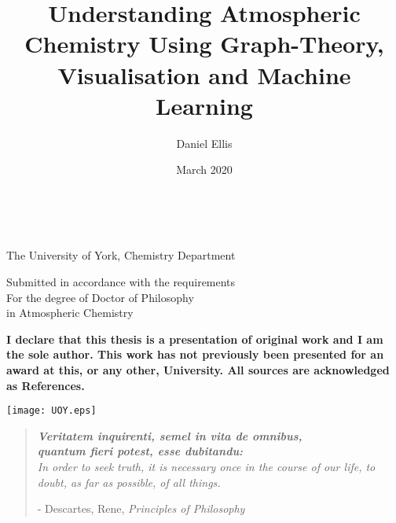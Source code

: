 \documentclass[twoside,openleft,reqno,a4paper,final]{book}
\title{Understanding Atmospheric Chemistry Using Graph-Theory, Visualisation and Machine Learning}
\author{Daniel Ellis}
\date{March 2020}
\makeatletter
\def\blankpage{%
      \clearpage%
      \thispagestyle{empty}%
      \addtocounter{page}{0}%
      \null%
      \clearpage}
\renewcommand{\maketitle}{

\thispagestyle{empty}
\begin{center}
\pagestyle{empty}
\phantom{.}  %
\vspace{1.5cm}

{\Huge \bf \@title\par}
\vspace{2cm}

{\LARGE \@author}\\[.7cm]

{\Large\@date}

\vspace{6cm}

The University of York, Chemistry Department

Submitted in accordance with the requirements\\
    For the degree of Doctor of Philosophy\\ in Atmospheric Chemistry

\vspace{1.3cm}


\textbf{I declare that this thesis is a presentation of original work and I am the sole author. This work has not previously been presented for an award at this, or any other, University. All sources are acknowledged as References.}

\vspace{1cm}
\texttt{[image: UOY.eps]}

\end{center}
}\makeatother
\makeatother
\begin{document}

\frontmatter
\titleformat{\paragraph}[hang]{\normalfont\normalsize\bfseries}{\theparagraph}{1em}{}



\setcounter{secnumdepth}{3}
\setcounter{tocdepth}{3}

 \maketitle




\cleardoublepage{}
\setlength{\footnotesep}{0.5cm}
\raggedbottom %

\restoregeometry
\vspace*{0.15\paperheight}
\begin{center}
\begin{quotation}
    \centering
  \large{\emph{\textbf{Veritatem inquirenti, semel in vita de omnibus,\\ quantum fieri potest, esse dubitandu:}\\
 In order to seek truth, it is necessary once in the course of our life, to doubt, as far as possible, of all things. }  }
\vspace{\baselineskip}\linebreak
  \begin{flushright}\small{
  - Descartes, Rene, \textit{Principles of Philosophy}
  }
\end{flushright}
 \end{quotation}
\end{center}



\tableofcontents
\newpage
\mainmatter



 \newpage



%
%
%
%
%
%
\end{document}
